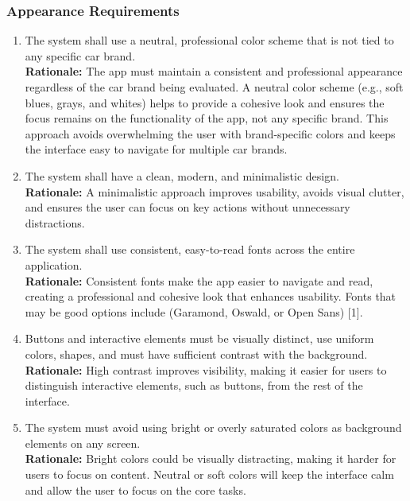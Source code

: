 \documentclass[]{article}
\begin{document}
\subsubsection{Appearance Requirements}
\label{ssub:appearance_requirements}
\begin{enumerate}[{LF-A}1.]
    \item The system shall use a neutral, professional color scheme that is not tied to any specific car brand. \\
    \textbf{Rationale:} The app must maintain a consistent and professional appearance regardless of the car brand being evaluated. A neutral color scheme (e.g., soft blues, grays, and whites) helps to provide a cohesive look and ensures the focus remains on the functionality of the app, not any specific brand. This approach avoids overwhelming the user with brand-specific colors and keeps the interface easy to navigate for multiple car brands.
    
    \item The system shall have a clean, modern, and minimalistic design.  \\
    \textbf{Rationale:} A minimalistic approach improves usability, avoids visual clutter, and ensures the user can focus on key actions without unnecessary distractions.

    \item The system shall use consistent, easy-to-read fonts across the entire application. \\ 
    \textbf{Rationale:} Consistent fonts make the app easier to navigate and read, creating a professional and cohesive look that enhances usability. Fonts that may be good options include (Garamond, Oswald, or Open Sans) [1].

    \item  Buttons and interactive elements must be visually distinct, use uniform colors, shapes, and must have sufficient contrast with the background. \\ 
    \textbf{Rationale:} High contrast improves visibility, making it easier for users to distinguish interactive elements, such as buttons, from the rest of the interface.

    \item The system must avoid using bright or overly saturated colors as background elements on any screen.  \\
    \textbf{Rationale:} Bright colors could be visually distracting, making it harder for users to focus on content. Neutral or soft colors will keep the interface calm and allow the user to focus on the core tasks.
\end{enumerate}
\end{document}
